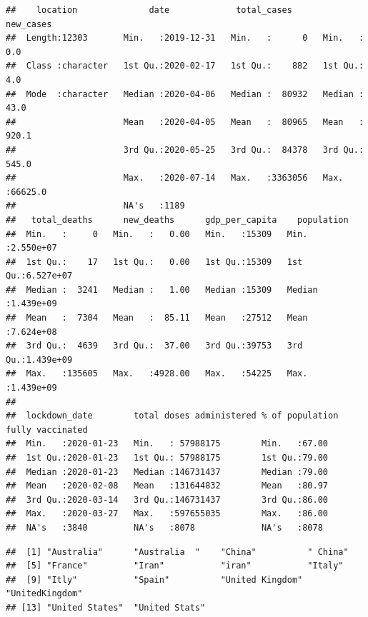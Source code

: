 \documentclass[
]{article}
\newenvironment{Shaded}{\begin{snugshade}}{\end{snugshade}}
\newcommand{\FunctionTok}[1]{\textcolor[rgb]{0.13,0.29,0.53}{\textbf{#1}}}
\newcommand{\NormalTok}[1]{#1}
\newcommand{\SpecialCharTok}[1]{\textcolor[rgb]{0.81,0.36,0.00}{\textbf{#1}}}
\begin{document}
\begin{verbatim}
##    location              date             total_cases        new_cases      
##  Length:12303       Min.   :2019-12-31   Min.   :      0   Min.   :    0.0  
##  Class :character   1st Qu.:2020-02-17   1st Qu.:    882   1st Qu.:    4.0  
##  Mode  :character   Median :2020-04-06   Median :  80932   Median :   43.0  
##                     Mean   :2020-04-05   Mean   :  80965   Mean   :  920.1  
##                     3rd Qu.:2020-05-25   3rd Qu.:  84378   3rd Qu.:  545.0  
##                     Max.   :2020-07-14   Max.   :3363056   Max.   :66625.0  
##                     NA's   :1189                                            
##   total_deaths      new_deaths      gdp_per_capita    population       
##  Min.   :     0   Min.   :   0.00   Min.   :15309   Min.   :2.550e+07  
##  1st Qu.:    17   1st Qu.:   0.00   1st Qu.:15309   1st Qu.:6.527e+07  
##  Median :  3241   Median :   1.00   Median :15309   Median :1.439e+09  
##  Mean   :  7304   Mean   :  85.11   Mean   :27512   Mean   :7.624e+08  
##  3rd Qu.:  4639   3rd Qu.:  37.00   3rd Qu.:39753   3rd Qu.:1.439e+09  
##  Max.   :135605   Max.   :4928.00   Max.   :54225   Max.   :1.439e+09  
##                                                                        
##  lockdown_date        total doses administered % of population fully vaccinated
##  Min.   :2020-01-23   Min.   : 57988175        Min.   :67.00                   
##  1st Qu.:2020-01-23   1st Qu.: 57988175        1st Qu.:79.00                   
##  Median :2020-01-23   Median :146731437        Median :79.00                   
##  Mean   :2020-02-08   Mean   :131644832        Mean   :80.97                   
##  3rd Qu.:2020-03-14   3rd Qu.:146731437        3rd Qu.:86.00                   
##  Max.   :2020-03-27   Max.   :597655035        Max.   :86.00                   
##  NA's   :3840         NA's   :8078             NA's   :8078
\end{verbatim}

\begin{Shaded}
\end{Shaded}

\begin{verbatim}
##  [1] "Australia"      "Australia  "    "China"          " China"        
##  [5] "France"         "Iran"           "iran"           "Italy"         
##  [9] "Itly"           "Spain"          "United Kingdom" "UnitedKingdom" 
## [13] "United States"  "United Stats"
\end{verbatim}
\end{document}
